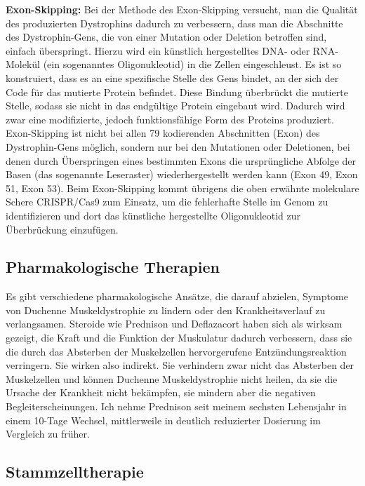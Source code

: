 \documentclass[fontsize=14pt,a4paper,headinclude,DIV=calc,automark]{scrbook}
\begin{document}
\noindent \textbf{Exon-Skipping:} Bei der Methode des Exon-Skipping versucht, man die Qualität des produzierten Dystrophins dadurch zu verbessern, dass man die Abschnitte des Dystrophin-Gens, die von einer Mutation oder Deletion betroffen sind, einfach überspringt. Hierzu wird ein künstlich hergestelltes DNA- oder RNA-Molekül (ein sogenanntes Oligonukleotid) in die Zellen eingeschleust. Es ist so konstruiert, dass es an eine spezifische Stelle des Gens bindet, an der sich der Code für das mutierte Protein befindet. Diese Bindung überbrückt die mutierte Stelle, sodass sie nicht in das endgültige Protein eingebaut wird. Dadurch wird zwar eine modifizierte, jedoch funktionsfähige Form des Proteins produziert. Exon-Skipping ist nicht bei allen 79 kodierenden Abschnitten (Exon) des Dystrophin-Gens möglich, sondern nur bei den Mutationen oder Deletionen, bei denen durch Überspringen eines bestimmten Exons die ursprüngliche Abfolge der Basen (das sogenannte Leseraster) wiederhergestellt werden kann (Exon 49, Exon 51, Exon 53). Beim Exon-Skipping kommt übrigens die oben erwähnte molekulare Schere CRISPR/Cas9 zum Einsatz, um die fehlerhafte Stelle im Genom zu identifizieren und dort das künstliche hergestellte Oligonukleotid zur Überbrückung einzufügen.

\subsection{Pharmakologische Therapien}

Es gibt verschiedene pharmakologische Ansätze, die darauf abzielen, Symptome von Duchenne Muskeldystrophie zu lindern oder den Krankheitsverlauf zu verlangsamen. Steroide wie Prednison und Deflazacort haben sich als wirksam gezeigt, die Kraft und die Funktion der Muskulatur dadurch verbessern, dass sie die durch das Absterben der Muskelzellen hervorgerufene Entzündungsreaktion verringern. Sie wirken also indirekt. Sie verhindern zwar nicht das Absterben der Muskelzellen und können Duchenne Muskeldystrophie nicht heilen, da sie die Ursache der Krankheit nicht bekämpfen, sie mindern aber die negativen Begleiterscheinungen. Ich nehme Prednison seit meinem sechsten Lebensjahr in einem 10-Tage Wechsel, mittlerweile in deutlich reduzierter Dosierung im Vergleich zu früher.

\subsection{Stammzelltherapie}
\end{document}
